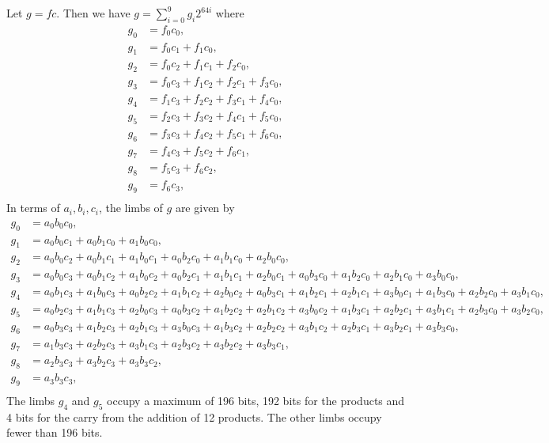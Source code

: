 \documentclass[a4paper, 12pt]{article}
\begin{document}
Let $g = fc$. Then we have $g = \sum_{i=0}^{9} g_i 2^{64i}$ where
\begin{align*}
  g_0 & = f_0c_0,\\
  g_1 & = f_0c_1 + f_1c_0,\\
  g_2 & = f_0c_2 + f_1c_1 + f_2c_0,\\
  g_3 & = f_0c_3 + f_1c_2 + f_2c_1 + f_3c_0,\\
  g_4 & = f_1c_3 + f_2c_2 + f_3c_1 + f_4c_0,\\
  g_5 & = f_2c_3 + f_3c_2 + f_4c_1 + f_5c_0,\\
  g_6 & = f_3c_3 + f_4c_2 + f_5c_1 + f_6c_0,\\
  g_7 & = f_4c_3 + f_5c_2 + f_6c_1,\\
  g_8 & = f_5c_3 + f_6c_2,\\
  g_9 & = f_6c_3,\\
\end{align*}
In terms of $a_i,b_i,c_i$, the limbs of $g$ are given by
\begin{align*}
  g_0 & = a_0b_0c_0,\\
  g_1 & = a_0b_0c_1 + a_0b_1c_0 + a_1b_0c_0,\\
  g_2 & = a_0b_0c_2 + a_0b_1c_1 + a_1b_0c_1 + a_0b_2c_0 + a_1b_1c_0 + a_2b_0c_0,\\
  g_3 & = a_0b_0c_3 + a_0b_1c_2 + a_1b_0c_2 + a_0b_2c_1 + a_1b_1c_1 + a_2b_0c_1 + a_0b_3c_0 + a_1b_2c_0 + a_2b_1c_0 + a_3b_0c_0,\\
  g_4 & = a_0b_1c_3 + a_1b_0c_3 + a_0b_2c_2 + a_1b_1c_2 + a_2b_0c_2 + a_0b_3c_1 + a_1b_2c_1 + a_2b_1c_1 + a_3b_0c_1 + a_1b_3c_0 + a_2b_2c_0 + a_3b_1c_0,\\
  g_5 & = a_0b_2c_3 + a_1b_1c_3 + a_2b_0c_3 + a_0b_3c_2 + a_1b_2c_2 + a_2b_1c_2 + a_3b_0c_2 + a_1b_3c_1 + a_2b_2c_1 + a_3b_1c_1 + a_2b_3c_0 + a_3b_2c_0,\\
  g_6 & = a_0b_3c_3 + a_1b_2c_3 + a_2b_1c_3 + a_3b_0c_3 + a_1b_3c_2 + a_2b_2c_2 + a_3b_1c_2 + a_2b_3c_1 + a_3b_2c_1 + a_3b_3c_0,\\
  g_7 & = a_1b_3c_3 + a_2b_2c_3 + a_3b_1c_3 + a_2b_3c_2 + a_3b_2c_2 + a_3b_3c_1,\\
  g_8 & = a_2b_3c_3 + a_3b_2c_3 + a_3b_3c_2,\\
  g_9 & = a_3b_3c_3,\\
\end{align*}
The limbs $g_4$ and $g_5$ occupy a maximum of 196 bits, 192 bits for the products and 4 bits for the carry from the addition of 12 products. The other limbs occupy fewer than 196 bits.
\end{document}
